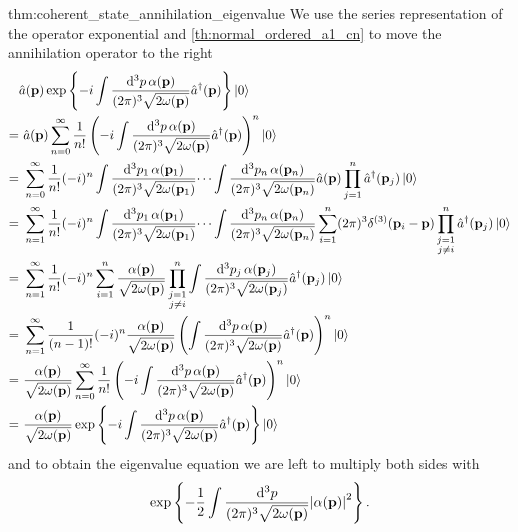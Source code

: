 \begin{delayedproof}{thm:coherent_state_annihilation_eigenvalue}
	We use the series representation of the operator exponential and \cref{th:normal_ordered_a1_cn} to move the annihilation operator to the right
	\begin{equation*}
		\begin{split}
			&
			\hat{a}(\vb{p})
			\exp\left\{
				-i
				\int\frac{\dd[3]{p}\alpha(\vb{p})}{(2\pi)^3\sqrt{2\omega(\vb{p})}}
				\hat{a}^\dagger(\vb{p})
			\right\}
			\ket{0}
			\\
			=&\
			\hat{a}(\vb{p})
			\sum_{n=0}^\infty
			\frac{1}{n!}
			\left(
				-i
				\int\frac{\dd[3]{p}\alpha(\vb{p})}{(2\pi)^3\sqrt{2\omega(\vb{p})}}
				\hat{a}^\dagger(\vb{p})
			\right)^n
			\ket{0}
			\\
			=&\
			\sum_{n=0}^\infty
			\frac{1}{n!}
			(-i)^n
			\int\frac{\dd[3]{p_1}\alpha(\vb{p}_1)}{(2\pi)^3\sqrt{2\omega(\vb{p}_1)}}
			\dots
			\int\frac{\dd[3]{p_n}\alpha(\vb{p}_n)}{(2\pi)^3\sqrt{2\omega(\vb{p}_n)}}
			\hat{a}(\vb{p})
			\prod_{j=1}^n
			\hat{a}^\dagger(\vb{p}_j)
			\ket{0}
			\\
			=&\
			\sum_{n=1}^\infty
			\frac{1}{n!}
			(-i)^n
			\int\frac{\dd[3]{p_1}\alpha(\vb{p}_1)}{(2\pi)^3\sqrt{2\omega(\vb{p}_1)}}
			\dots
			\int\frac{\dd[3]{p_n}\alpha(\vb{p}_n)}{(2\pi)^3\sqrt{2\omega(\vb{p}_n)}}
			\sum_{i=1}^n
			(2\pi)^3
			\delta^{(3)}(\vb{p}_i-\vb{p})
			\prod_{\substack{j=1\\j\neq i}}^n
			\hat{a}^\dagger(\vb{p}_j)
			\ket{0}
			\\
			=&\
			\sum_{n=1}^\infty
			\frac{1}{n!}
			(-i)^n
			\sum_{i=1}^n
			\frac{\alpha(\vb{p})}{\sqrt{2\omega(\vb{p})}}
			\prod_{\substack{j=1\\j\neq i}}^n
			\int\frac{\dd[3]{p_j}\alpha(\vb{p}_j)}{(2\pi)^3\sqrt{2\omega(\vb{p}_j)}}
			\hat{a}^\dagger(\vb{p}_j)
			\ket{0}
			\\
			=&\
			\sum_{n=1}^\infty
			\frac{1}{(n-1)!}
			(-i)^n
			\frac{\alpha(\vb{p})}{\sqrt{2\omega(\vb{p})}}
			\left(
				\int\frac{\dd[3]{p}\alpha(\vb{p})}{(2\pi)^3\sqrt{2\omega(\vb{p})}}
				\hat{a}^\dagger(\vb{p})
			\right)^n
			\ket{0}
			\\
			=&\
			\frac{\alpha(\vb{p})}{\sqrt{2\omega(\vb{p})}}
			\sum_{n=0}^\infty
			\frac{1}{n!}
			\left(
				-i
				\int\frac{\dd[3]{p}\alpha(\vb{p})}{(2\pi)^3\sqrt{2\omega(\vb{p})}}
				\hat{a}^\dagger(\vb{p})
			\right)^n
			\ket{0}
			\\
			=&\
			\frac{\alpha(\vb{p})}{\sqrt{2\omega(\vb{p})}}
			\exp\left\{
				-i
				\int\frac{\dd[3]{p}\alpha(\vb{p})}{(2\pi)^3\sqrt{2\omega(\vb{p})}}
				\hat{a}^\dagger(\vb{p})
			\right\}
			\ket{0}
		\end{split}
	\end{equation*}
	and to obtain the eigenvalue equation we are left to multiply both sides with
	\begin{equation*}
		\exp\left\{
			-
			\frac{1}{2}
			\int\frac{\dd[3]{p}}{(2\pi)^3\sqrt{2\omega(\vb{p})}}
			\abs{\alpha(\vb{p})}^2
		\right\}
		.
	\end{equation*}
\end{delayedproof}
